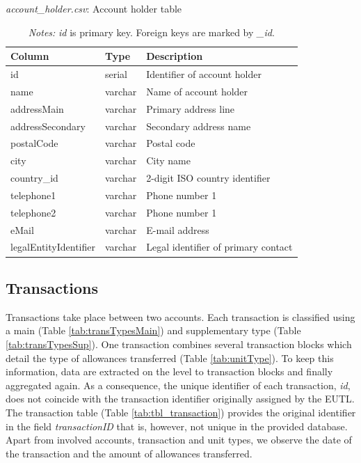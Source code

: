 \documentclass[authoryear]{elsarticle}
\begin{document}
\begin{table}[htbp]\scriptsize
	\caption{\textit{account\_holder.csv}: Account holder table}\label{tab:tbl_holder}
	\centering
	\begin{tabular*}{\textwidth}{@{}@{\extracolsep{\fill}} lll @{}}
		\toprule
		\toprule
		\textbf{Column} & \textbf{Type}  & \textbf{Description} \\
		\midrule
		id    & serial & Identifier of account holder \\
		name  & varchar & Name of account holder \\
		addressMain & varchar & Primary address line \\
		addressSecondary & varchar & Secondary address name \\
		postalCode & varchar & Postal code \\
		city  & varchar & City name \\
		country\_id & varchar & 2-digit ISO country identifier \\
		telephone1  & varchar & Phone number 1 \\
		telephone2  & varchar & Phone number 1 \\
		eMail  & varchar & E-mail address \\
		legalEntityIdentifier & varchar & Legal identifier of primary contact\\
		\bottomrule
		\bottomrule
	\end{tabular*}%
	\vspace{-3ex}
\caption*{\footnotesize \emph{Notes:} \textit{id} is primary key. Foreign keys are marked by \textit{\_id}.}
\vspace{0ex}
\end{table}

\subsection{Transactions}
Transactions take place between two accounts. Each transaction is classified using a main (Table \ref{tab:transTypesMain}) and supplementary type (Table \ref{tab:transTypesSup}). One transaction combines several transaction blocks which detail the type of allowances transferred (Table \ref{tab:unitType}). To keep this information, data are extracted on the level to transaction blocks and finally aggregated again. As a consequence, the unique identifier of each transaction, \textit{id}, does not coincide with the transaction identifier originally assigned by the EUTL. The transaction table (Table \ref{tab:tbl_transaction}) provides the original identifier in the field \textit{transactionID} that is, however, not unique in the provided database. Apart from involved accounts, transaction and unit types, we observe the date of the transaction and the amount of allowances transferred. 
\end{document}
